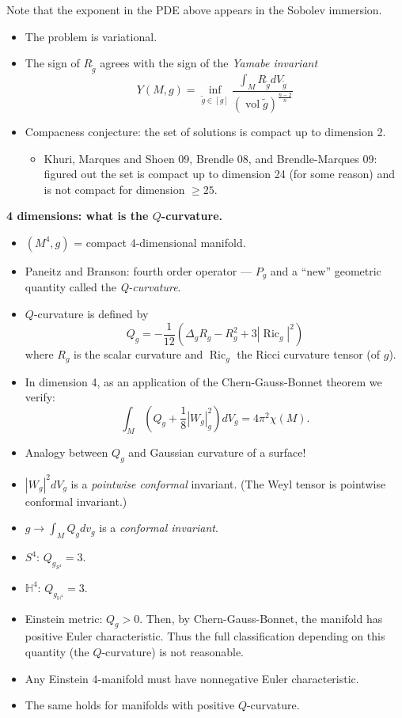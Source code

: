 Note that the exponent in the PDE above
appears in the Sobolev immersion.

\begin{itemize}
\item The problem is variational.
\item The sign of $R_{\tilde{g}}$ agrees
with the sign of the {\it Yamabe invariant} 
$$
Y(M,g)=
\operatorname{inf}_{\tilde{g} \in [g]}
\frac{\int_M
R_{\tilde{g}}dV_{\tilde{g}}}{(\operatorname{vol}\tilde{g})^{\frac{n-2}{n}}}
$$
\item Compacness conjecture: the set of
solutions is compact up to dimension 2.
\begin{itemize}
\item Khuri, Marques and Shoen 09, Brendle
08, and Brendle-Marques 09: figured out the
set is compact up to dimension 24 (for some
reason) and is not compact for dimension
$\geq  25$.
\end{itemize}
\end{itemize}

\medskip\noindent
{\bf 4 dimensions: what is the
$Q$-curvature.}
\begin{itemize}
\item $(M^4,g)$ = compact 4-dimensional
manifold.
\item Paneitz and Branson: fourth order
operator --- $P_g$ and a ``new'' geometric
quantity called the {\it Q-curvature}.
\item $Q$-curvature is defined by
$$
Q_g = -\frac{1}{12}
\left(\Delta_g R_g - R_g^2+3
|\operatorname{Ric}_g|^2\right)
$$
where $R_g$ is the scalar curvature and
$\operatorname{Ric}_g$ the Ricci curvature
tensor (of $g$).

\item In dimension 4, as an application of
the Chern-Gauss-Bonnet theorem we verify:
$$
\int_M\left(Q_g + \frac{1}{8}|W_g|^2_g
\right)d V_g
= 4 \pi^2\chi(M).
$$

\item Analogy between $Q_g$ and Gaussian
curvature of a surface!

\item $|W_g|^2 dV_g$ is a {\it pointwise
conformal} invariant. (The Weyl tensor
is pointwise conformal invariant.)
\item $g \to \int_M Q_g dv_g$
is a {\it conformal invariant}.
\end{itemize}

\begin{example}
\label{example-q-curvature}
\begin{itemize}
\item $S^4$: $Q_{g_{S^4}}=3$.
\item $\mathbb{H}^4$:
$Q_{g_{\mathbb{H}^4}}=3$.
\item Einstein metric: $Q_g > 0$. Then, by
Chern-Gauss-Bonnet, the manifold has
positive Euler characteristic.
Thus the full classification depending on
this quantity (the $Q$-curvature) is not
reasonable.
\item Any Einstein 4-manifold must have
nonnegative Euler characteristic.
\item  The same holds for manifolds with
positive $Q$-curvature.
\end{itemize}
\end{example}

